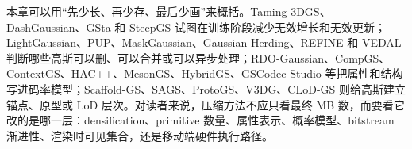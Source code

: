 \begin{takeaway}
本章可以用“先少长、再少存、最后少画”来概括。Taming 3DGS、DashGaussian、GSta 和 SteepGS 试图在训练阶段减少无效增长和无效更新；LightGaussian、PUP、MaskGaussian、Gaussian Herding、REFINE 和 VEDAL 判断哪些高斯可以删、可以合并或可以异步处理；RDO-Gaussian、CompGS、ContextGS、HAC++、MesonGS、HybridGS、GSCodec Studio 等把属性和结构写进码率模型；Scaffold-GS、SAGS、ProtoGS、V3DG、CLoD-GS 则给高斯建立锚点、原型或 LoD 层次。对读者来说，压缩方法不应只看最终 MB 数，而要看它改的是哪一层：densification、primitive 数量、属性表示、概率模型、bitstream 渐进性、渲染时可见集合，还是移动端硬件执行路径。
\end{takeaway}
